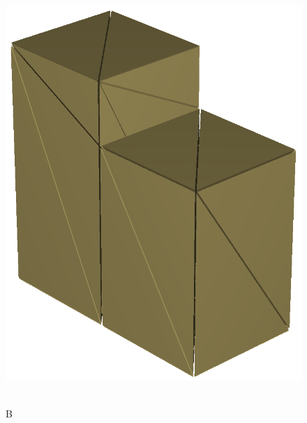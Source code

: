 \begin{figure}[t]
\begin{minipage}{0.9\linewidth}
\begin{minipage}{0.45\textwidth}
\end{minipage}
\begin{minipage}{0.25\textwidth}
\includegraphics[width=\textwidth]{images/TetraMesh_WithNullFaces_AfterSubdivision_crop.png}
\end{minipage}
\\
B
\begin{minipage}{0.25\textwidth}

\end{minipage}
\end{minipage}
\end{figure}
